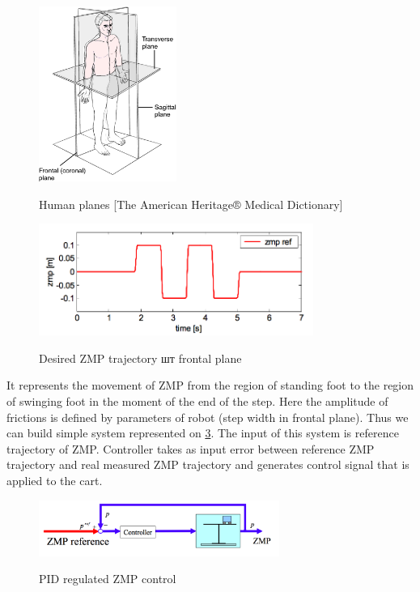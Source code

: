 \documentclass[12pt,a4paper]{report}
\begin{document}
		\begin{figure}[h!]
			\vspace{-0.2cm}
			\centering
			{\includegraphics[width=0.4\textwidth]{7}}
			\caption{Human planes [The American Heritage® Medical Dictionary]}
			\label{fig:7}
			\vspace{-0.1cm}
		\end{figure}
		\begin{figure}[h!]
			\vspace{-0.2cm}
			\centering
			{\includegraphics[width=0.8\textwidth]{8}}
			\caption{Desired ZMP trajectory шт frontal plane \cite{kajita2003biped}}
			\label{fig:8}
			\vspace{-0.1cm}
		\end{figure}
		It represents the movement of ZMP from the region of standing foot to the region of swinging foot in the moment of the end of the step. Here the amplitude of frictions is defined by parameters of robot (step width in frontal plane). Thus we can build simple system represented on \cref{fig:9}. The input of this system is reference trajectory of ZMP. Controller takes as input error between reference ZMP trajectory and real measured ZMP trajectory and generates control signal that is applied to the cart. 
		\begin{figure}[h!]
			\vspace{-0.2cm}
			\centering
			{\includegraphics[width=0.7\textwidth]{9}}
			\caption{PID regulated ZMP control \cite{kajita2003biped}}
			\label{fig:9}
			\vspace{-0.1cm}
		\end{figure}
\end{document}
